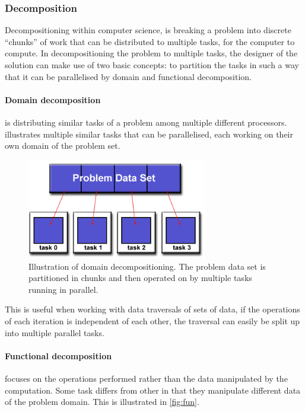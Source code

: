 \subsubsection{Decomposition}
Decompositioning within computer science, is breaking a problem into discrete \enquote{chunks} of work that can be distributed to multiple tasks, for the computer to compute. In decompositioning the problem to multiple tasks, the designer of the solution can make use of two basic concepts: to partition the tasks in such a way that it can be parallelised by domain and functional decomposition.

\paragraph{Domain decomposition} is distributing similar tasks of a problem among multiple different processors.  illustrates multiple similar tasks that can be parallelised, each working on their own domain of the problem set.

\begin{figure}[htbp]
\centering
\includegraphics[width=0.7\textwidth]{Analysis/Supercomputing/domain_decomp.png}
\caption{Illustration of domain decompositioning. The problem data set is partitioned in chunks and then operated on by multiple tasks running in parallel. \cite{compLLNL}}\label{fig:dom}
\end{figure}

This is useful when working with data traversals of sets of data, if the operations of each iteration is independent of each other, the traversal can easily be split up into multiple parallel tasks.

\paragraph{Functional decomposition} focuses on the operations performed rather than the data manipulated by the computation. Some task differs from other in that they manipulate different data of the problem domain. This is illustrated in \cref{fig:fun}.

